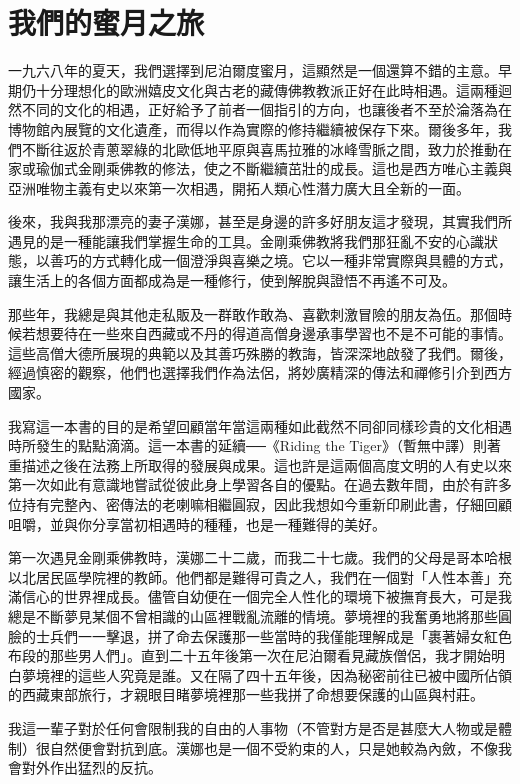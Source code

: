 
\chapter{我們的蜜月之旅}


一九六八年的夏天，我們選擇到尼泊爾度蜜月，這顯然是一個還算不錯的主意。早期仍十分理想化的歐洲嬉皮文化與古老的藏傳佛教教派正好在此時相遇。這兩種迴然不同的文化的相遇，正好給予了前者一個指引的方向，也讓後者不至於淪落為在博物館內展覽的文化遺產，而得以作為實際的修持繼續被保存下來。爾後多年，我們不斷往返於青蔥翠綠的北歐低地平原與喜馬拉雅的冰峰雪脈之間，致力於推動在家或瑜伽式金剛乘佛教的修法，使之不斷繼續茁壯的成長。這也是西方唯心主義與亞洲唯物主義有史以來第一次相遇，開拓人類心性潛力廣大且全新的一面。

後來，我與我那漂亮的妻子漢娜，甚至是身邊的許多好朋友這才發現，其實我們所遇見的是一種能讓我們掌握生命的工具。金剛乘佛教將我們那狂亂不安的心識狀態，以善巧的方式轉化成一個澄淨與喜樂之境。它以一種非常實際與具體的方式，讓生活上的各個方面都成為是一種修行，使到解脫與證悟不再遙不可及。

那些年，我總是與其他走私販及一群敢作敢為、喜歡刺激冒險的朋友為伍。那個時候若想要待在一些來自西藏或不丹的得道高僧身邊承事學習也不是不可能的事情。這些高僧大德所展現的典範以及其善巧殊勝的教誨，皆深深地啟發了我們。爾後，經過慎密的觀察，他們也選擇我們作為法侶，將妙廣精深的傳法和禪修引介到西方國家。

我寫這一本書的目的是希望回顧當年當這兩種如此截然不同卻同樣珍貴的文化相遇時所發生的點點滴滴。這一本書的延續──《Riding the Tiger》（暫無中譯）則著重描述之後在法務上所取得的發展與成果。這也許是這兩個高度文明的人有史以來第一次如此有意識地嘗試從彼此身上學習各自的優點。在過去數年間，由於有許多位持有完整內、密傳法的老喇嘛相繼圓寂，因此我想如今重新印刷此書，仔細回顧咀嚼，並與你分享當初相遇時的種種，也是一種難得的美好。

第一次遇見金剛乘佛教時，漢娜二十二歲，而我二十七歲。我們的父母是哥本哈根以北居民區學院裡的教師。他們都是難得可貴之人，我們在一個對「人性本善」充滿信心的世界裡成長。儘管自幼便在一個完全人性化的環境下被撫育長大，可是我總是不斷夢見某個不曾相識的山區裡戰亂流離的情境。夢境裡的我奮勇地將那些圓臉的士兵們一一擊退，拼了命去保護那一些當時的我僅能理解成是「裹著婦女紅色布段的那些男人們」。直到二十五年後第一次在尼泊爾看見藏族僧侶，我才開始明白夢境裡的這些人究竟是誰。又在隔了四十五年後，因為秘密前往已被中國所佔領的西藏東部旅行，才親眼目睹夢境裡那一些我拼了命想要保護的山區與村莊。

我這一輩子對於任何會限制我的自由的人事物（不管對方是否是甚麼大人物或是體制）很自然便會對抗到底。漢娜也是一個不受約束的人，只是她較為內斂，不像我會對外作出猛烈的反抗。

